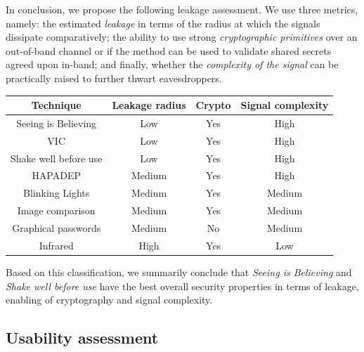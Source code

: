 \documentclass[conference, 11pt]{sty/IEEEtran}
\begin{document}
In conclusion, we propose the following leakage assessment.
We use three metrics, namely: the estimated \emph{leakage} in terms of the radius at which the signals dissipate comparatively; the ability to use strong \emph{cryptographic primitives} over an out-of-band channel or if the method can be used to validate shared secrets agreed upon in-band; and finally, whether the \emph{complexity of the signal} can be practically raised to further thwart eavesdroppers.

\hspace{-2em}
\begin{footnotesize}
\begin{tabular}{c|c|c|c}
	Technique & Leakage radius & Crypto & Signal complexity \\
	\hline
	  Seeing is Believing & Low & Yes & High \\
	  VIC & Low & Yes & High \\
	Shake well before use & Low & Yes & High \\
	 HAPADEP & Medium & Yes & High \\
  Blinking Lights & Medium & Yes & Medium \\
	Image comparison & Medium & Yes & Medium\\
    	  Graphical passwords & Medium & No & Medium \\
	Infrared & High & Yes & Low \\
\end{tabular}
\end{footnotesize}
\hspace{2em}

Based on this classification, we summarily conclude that \textit{Seeing is Believing} and \textit{Shake well before use} have the best overall security properties in terms of leakage, enabling of cryptography and signal complexity.


\subsection{Usability assessment}
\label{ssec:usability_assessment}
\end{document}
